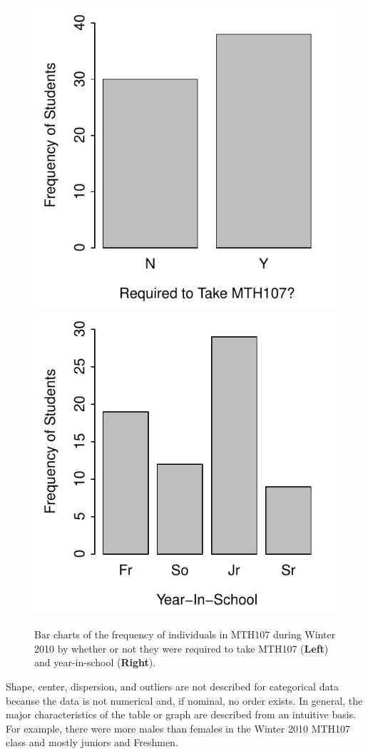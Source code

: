 \documentclass[10pt,openany]{book}\usepackage[]{graphicx}\usepackage[]{color}
\newenvironment{knitrout}{}{} %
\begin{document}
\begin{knitrout}
\color{fgcolor}\begin{figure}[hbtp]

{\centering \includegraphics[width=.4\linewidth]{Figs/MTH107BarChart-1} 
\includegraphics[width=.4\linewidth]{Figs/MTH107BarChart-2} 

}

\caption[Bar charts of the frequency of individuals in MTH107 during Winter 2010 by whether or not they were required to take MTH107 (\textbf{Left}) and year-in-school (\textbf{Right})]{Bar charts of the frequency of individuals in MTH107 during Winter 2010 by whether or not they were required to take MTH107 (\textbf{Left}) and year-in-school (\textbf{Right}).}\label{fig:MTH107BarChart}
\end{figure}


\end{knitrout}


Shape, center, dispersion, and outliers are not described for categorical data because the data is not numerical and, if nominal, no order exists.  In general, the major characteristics of the table or graph are described from an intuitive basis.  For example, there were more males than females in the Winter 2010 MTH107 class and mostly juniors and Freshmen.
\end{document}
